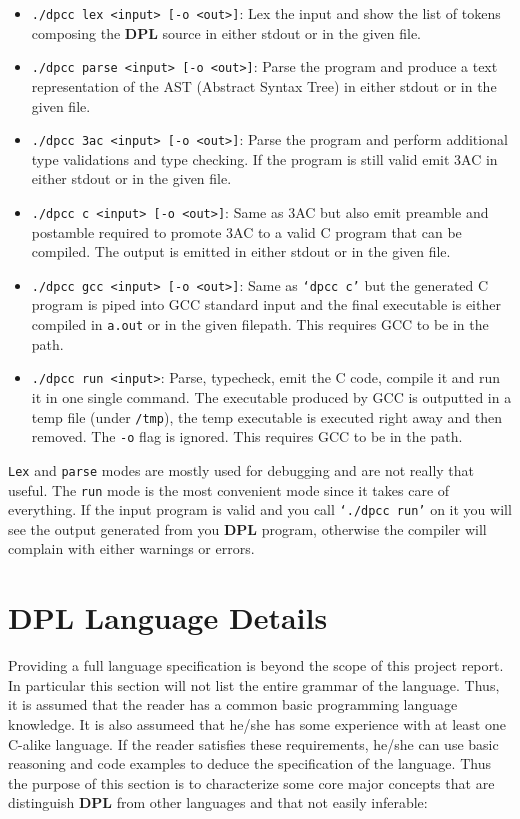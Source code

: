 \documentclass[a4paper]{article}
\begin{document}
\begin{itemize}
    \item \texttt{./dpcc lex <input> [-o <out>]}: Lex the input and show the list of tokens composing the \textbf{DPL} source in either stdout or in the given file.
    \item \texttt{./dpcc parse <input> [-o <out>]}: Parse the program and produce a text representation of the AST (Abstract Syntax Tree) in either stdout or in the given file.
    \item \texttt{./dpcc 3ac <input> [-o <out>]}: Parse the program and perform additional type validations and type checking. If the program is still valid emit 3AC in either stdout or in the given file.
    \item \texttt{./dpcc c <input> [-o <out>]}: Same as 3AC but also emit preamble and postamble required  to promote 3AC to a  valid C program that can be compiled. The output is emitted in either stdout or in the given file.
    \item \texttt{./dpcc gcc <input> [-o <out>]}: Same as \texttt{`dpcc c'} but the generated C program is piped into GCC standard input and the final executable is either compiled in \texttt{a.out} or in the given filepath. This requires GCC to be in the path.
    \item \texttt{./dpcc run <input>}: Parse, typecheck, emit the C code, compile it and run it in one single command. The executable produced by GCC is outputted in a temp file (under \texttt{/tmp}), the temp executable is executed right away and then removed. The \texttt{-o} flag is ignored. This requires GCC to be in the path.
\end{itemize}

\texttt{Lex} and \texttt{parse} modes are mostly used for debugging and are not really that useful.
The \texttt{run} mode
is the most convenient mode since it takes care of everything. If the input program is valid and
you call \texttt{`./dpcc run'} on it you will see the output generated from you \textbf{DPL} program,
otherwise the compiler will complain with either warnings or errors.

\clearpage

\section{DPL Language Details}

Providing a full language specification is beyond the scope of this project report. In particular
this section will not list the entire grammar of the language. Thus, it is assumed
that the reader has a common basic programming language knowledge. It is also assumeed that he/she has some experience
with at least one C-alike language. If the reader satisfies these requirements, he/she can use
basic reasoning and code examples to deduce the specification of the language. Thus the purpose
of this section is to characterize some core major concepts that are distinguish
\textbf{DPL} from other languages and that not easily inferable:
\end{document}
